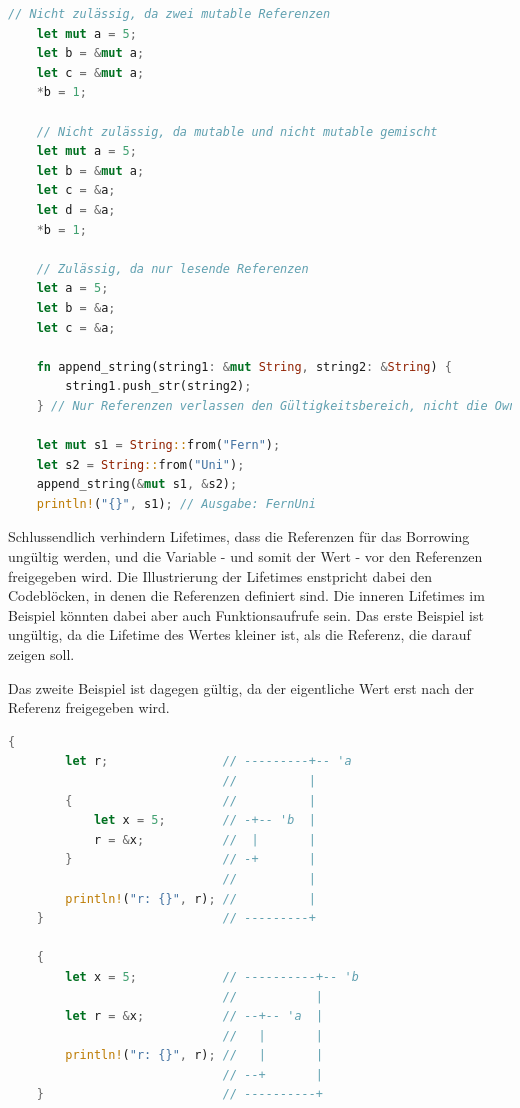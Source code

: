 \documentclass[11pt,a4paper, ngerman]{article}
\begin{document}
\begin{lstlisting}[language=rust, caption={borrowing}]
    // Nicht zulässig, da zwei mutable Referenzen
    let mut a = 5;
    let b = &mut a;
    let c = &mut a;
    *b = 1;

    // Nicht zulässig, da mutable und nicht mutable gemischt
    let mut a = 5;
    let b = &mut a;
    let c = &a;
    let d = &a;
    *b = 1;

    // Zulässig, da nur lesende Referenzen
    let a = 5;
    let b = &a;
    let c = &a;

    fn append_string(string1: &mut String, string2: &String) {
        string1.push_str(string2);
    } // Nur Referenzen verlassen den Gültigkeitsbereich, nicht die Owner!

    let mut s1 = String::from("Fern");
    let s2 = String::from("Uni");
    append_string(&mut s1, &s2);
    println!("{}", s1); // Ausgabe: FernUni
\end{lstlisting}

Schlussendlich verhindern Lifetimes, dass die Referenzen für das Borrowing ungültig werden, und die Variable - und somit der Wert - vor den Referenzen freigegeben wird. Die Illustrierung der Lifetimes enstpricht dabei den Codeblöcken, in denen die Referenzen definiert sind. Die inneren Lifetimes im Beispiel könnten dabei aber auch Funktionsaufrufe sein. Das erste Beispiel ist ungültig, da die Lifetime des Wertes kleiner ist, als die Referenz, die darauf zeigen soll.

Das zweite Beispiel ist dagegen gültig, da der eigentliche Wert erst nach der Referenz freigegeben wird.

\newpage

\begin{lstlisting}[language=rust, caption={Lifetime Veranschaulichung \cite{LifetimeEx}}]
    {
        let r;                // ---------+-- 'a
                              //          |
        {                     //          |
            let x = 5;        // -+-- 'b  |
            r = &x;           //  |       |
        }                     // -+       |
                              //          |
        println!("r: {}", r); //          |
    }                         // ---------+

    {
        let x = 5;            // ----------+-- 'b
                              //           |
        let r = &x;           // --+-- 'a  |
                              //   |       |
        println!("r: {}", r); //   |       |
                              // --+       |
    }                         // ----------+
\end{lstlisting}
\end{document}
